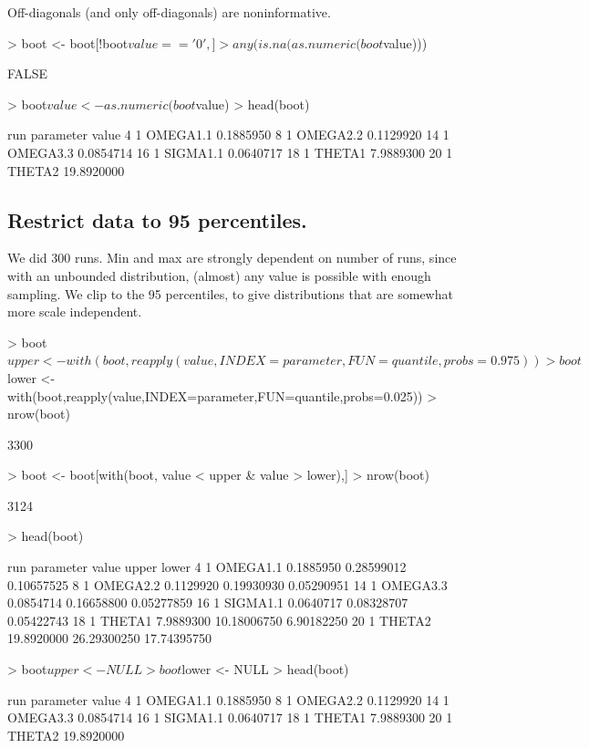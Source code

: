 Off-diagonals (and only off-diagonals) are noninformative.
\begin{Schunk}
\begin{Sinput}
> boot <- boot[!boot$value=='0',]
> any(is.na(as.numeric(boot$value)))
\end{Sinput}
\begin{Soutput}
[1] FALSE
\end{Soutput}
\begin{Sinput}
> boot$value <- as.numeric(boot$value)
> head(boot)
\end{Sinput}
\begin{Soutput}
   run parameter      value
4    1  OMEGA1.1  0.1885950
8    1  OMEGA2.2  0.1129920
14   1  OMEGA3.3  0.0854714
16   1  SIGMA1.1  0.0640717
18   1    THETA1  7.9889300
20   1    THETA2 19.8920000
\end{Soutput}
\end{Schunk}
\subsection{Restrict data to 95 percentiles.}
We did 300 runs.  Min and max are strongly dependent on number of runs, since 
with an unbounded distribution, (almost) any value is possible with enough sampling.
We clip to the 95 percentiles, to give distributions that are somewhat more
scale independent.
\begin{Schunk}
\begin{Sinput}
> boot$upper <- with(boot,reapply(value,INDEX=parameter,FUN=quantile,probs=0.975))
> boot$lower <- with(boot,reapply(value,INDEX=parameter,FUN=quantile,probs=0.025))
> nrow(boot)
\end{Sinput}
\begin{Soutput}
[1] 3300
\end{Soutput}
\begin{Sinput}
> boot <- boot[with(boot, value < upper & value > lower),]
> nrow(boot)
\end{Sinput}
\begin{Soutput}
[1] 3124
\end{Soutput}
\begin{Sinput}
> head(boot)
\end{Sinput}
\begin{Soutput}
   run parameter      value       upper       lower
4    1  OMEGA1.1  0.1885950  0.28599012  0.10657525
8    1  OMEGA2.2  0.1129920  0.19930930  0.05290951
14   1  OMEGA3.3  0.0854714  0.16658800  0.05277859
16   1  SIGMA1.1  0.0640717  0.08328707  0.05422743
18   1    THETA1  7.9889300 10.18006750  6.90182250
20   1    THETA2 19.8920000 26.29300250 17.74395750
\end{Soutput}
\begin{Sinput}
> boot$upper <- NULL
> boot$lower <- NULL
> head(boot)
\end{Sinput}
\begin{Soutput}
   run parameter      value
4    1  OMEGA1.1  0.1885950
8    1  OMEGA2.2  0.1129920
14   1  OMEGA3.3  0.0854714
16   1  SIGMA1.1  0.0640717
18   1    THETA1  7.9889300
20   1    THETA2 19.8920000
\end{Soutput}
\end{Schunk}
